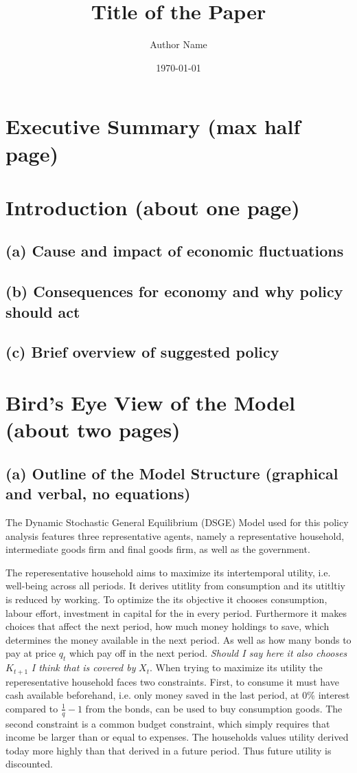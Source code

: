 \documentclass[12pt]{article}
\title{Title of the Paper}
\author{Author Name}
\date{\today}
\begin{document}
\maketitle

\section{Executive Summary (max half page)}

\section{Introduction (about one page) }
\subsection{(a) Cause and impact of economic fluctuations} 
\subsection{(b) Consequences for economy and why policy should act} 
\subsection{(c) Brief overview of suggested policy} 

\section{Bird’s Eye View of the Model (about two pages) }
\subsection{(a) Outline of the Model Structure (graphical and verbal, no equations) }
The Dynamic Stochastic General Equilibrium (DSGE) Model used for this policy analysis features
three representative agents, namely a representative household, intermediate goods firm and final goods firm, 
as well as the government. 

The reperesentative household aims to maximize its intertemporal utility, i.e. well-being 
across all periods. It derives utitlity from consumption and its utitltiy is reduced by working. To optimize the its objective
it chooses consumption, labour effort, investment in capital for the in every period. %
Furthermore it makes choices that affect the next period,  how much money holdings to save, which determines the money available
in the next period. As well as how many bonds to pay at price $q_t$ which pay off in the next period. \emph{Should 
I say here it also chooses} $K_{t+1}$ \emph{I think that is covered by } $X_t$. When trying to maximize its utility
the reperesentative household faces two constraints. First, to consume it must have cash available beforehand, i.e. only money 
saved in the last period, at 0\% interest compared to $\frac{1}{q} -1$ from the bonds, can be used to buy consumption goods. 
The second constraint is a common budget constraint, which simply requires that income be larger than or equal to expenses. 
The households values utility derived today more highly than that derived in a future period. Thus future utility is discounted. 
\end{document}
